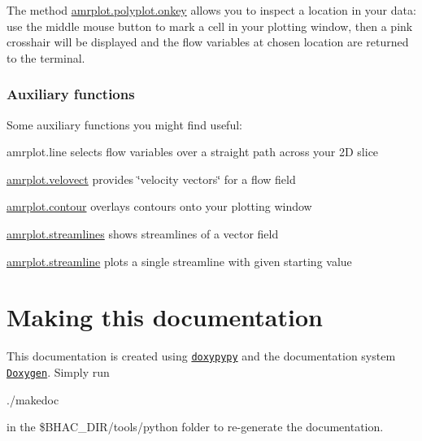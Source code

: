 The method \hyperlink{classamrplot_1_1polyplot_af40653c737fcd78dc956ac51a5a2ac9a}{amrplot.\+polyplot.\+onkey} allows you to inspect a location in your data\+: use the middle mouse button to mark a cell in your plotting window, then a pink crosshair will be displayed and the flow variables at chosen location are returned to the terminal.\hypertarget{index_convenience}{}\subsubsection{Auxiliary functions}\label{index_convenience}
Some auxiliary functions you might find useful\+:
\begin{DoxyItemize}
\item amrplot.\+line selects flow variables over a straight path across your 2D slice
\item \hyperlink{namespaceamrplot_ae376991fb7aa92c1e8a41501d7910479}{amrplot.\+velovect} provides \char`\"{}velocity vectors\char`\"{} for a flow field
\item \hyperlink{namespaceamrplot_a6c85688725768d179b09bc02dffca0f3}{amrplot.\+contour} overlays contours onto your plotting window
\item \hyperlink{namespaceamrplot_afd42022e288c73e942784cf1207fa538}{amrplot.\+streamlines} shows streamlines of a vector field
\item \hyperlink{namespaceamrplot_a214eccffe1d56a25d80925cc453f5a23}{amrplot.\+streamline} plots a single streamline with given starting value
\end{DoxyItemize}\hypertarget{index_doc}{}\section{Making this documentation}\label{index_doc}
This documentation is created using \href{https://github.com/Feneric/doxypypy}{\tt doxypypy} and the documentation system \href{http:www.doxygen.org}{\tt Doxygen}. Simply run 
\begin{DoxyCode}
./makedoc
\end{DoxyCode}
 in the {\ttfamily \$\+B\+H\+A\+C\+\_\+\+D\+IR/tools/python} folder to re-\/generate the documentation. 